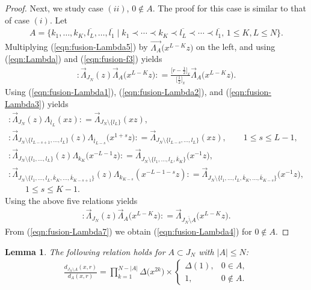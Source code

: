 \documentclass[10pt,a4paper]{amsart}
\numberwithin{equation}{section}
\newtheorem{Lemma}[Theorem]{Lemma}
\begin{document}
\begin{proof}
Next, we study case $(ii)$, $0 \notin A$. The proof for this case is similar to that of case $(i)$.
Let
\begin{gather*}
A=\big\{k_1, \dots,k_K, \overline{l_L}, \dots, \overline{l_1} \mid
k_1\prec \cdots \prec k_K \prec\overline{l_L} \prec \cdots \prec \overline{l_1},\,
1\leq K, L \leq N\big\}.
\end{gather*}
Multiplying (\ref{eqn:fusion-Lambda5}) by
$\overrightarrow{\Lambda_A}\big(x^{L-K}z\big)$
on the left, and using (\ref{eqn:Lambda}) and (\ref{eqn:fusion-f3}) yields
\begin{gather}
{:}\overrightarrow{\Lambda}_{J_N}(z)
\overrightarrow{\Lambda}_A\big(x^{L-K}z\big){:}=\frac{\big[r-\frac{1}{2}\big]_x}{\big[\frac{1}{2}\big]_x}
\overrightarrow{\Lambda}_A\big(x^{L-K}z\big).
\label{eqn:fusion-Lambda7}
\end{gather}
Using (\ref{eqn:fusion-Lambda1}), (\ref{eqn:fusion-Lambda2}), and
(\ref{eqn:fusion-Lambda3}) yields
\begin{gather*}
{:}\overrightarrow{\Lambda}_{J_N}(z)\Lambda_{\overline{l}_L}(xz){:}
=\overrightarrow{\Lambda}_{J_N{\setminus} \{l_L\}}(xz),
\\
{:}\overrightarrow{\Lambda}_{J_N{\setminus}
\{l_{L-s+1},\dots, l_{L}\}}(z)\Lambda_{\overline{l}_{L-s}}\big(x^{1+s}z\big){:}
=\overrightarrow{\Lambda}_{J_N{\setminus}
\{l_{L-s},\dots, l_L\}}(xz),\qquad
1\leq s \leq L-1,
\\
{:}\overrightarrow{\Lambda}_{J_N{\setminus} \{l_1, \dots, l_L\}}(z)
\Lambda_{{k}_K}\big(x^{-L-1}z\big){:}
=\overrightarrow{\Lambda}_{J_N{\setminus} \{l_1,\dots, l_L, \overline{k}_K\}}\big(x^{-1}z\big),
\\
{:}\overrightarrow{\Lambda}_{J_N{\setminus} \{l_1,\dots, l_{L},
\overline{k}_K, \dots, \overline{k}_{K-s+1}\}}(z)
\Lambda_{{k}_{K-s}}(x^{-L-1-s}z){:}
=\overrightarrow{\Lambda}_{J_N{\setminus} \{l_1,\dots, l_L, \overline{k}_K,\dots, \overline{k}_{K-s}\}}\big(x^{-1}z\big),
\\
\qquad
1\leq s \leq K-1.
\end{gather*}
Using the above five relations yields
\begin{gather*}
{:}\overrightarrow{\Lambda}_{J_N}(z)\overrightarrow{\Lambda}_A\big(x^{L-K}z\big){:}=
\overrightarrow{\Lambda}_{\overline{J_N \setminus A}}\big(x^{L-K}z\big).
\end{gather*}
From (\ref{eqn:fusion-Lambda7}) we obtain (\ref{eqn:fusion-Lambda4}) for $0 \notin A$.
\end{proof}

\begin{Lemma}
The following relation holds for $A \subset J_N$ with $|A|\leq N$:
\begin{gather}
\frac{d_{{J_N \setminus A}}(x,r)}{d_{A}(x,r)}=\prod_{k=1}^{N-|A|}
\Delta\big(x^{2k}\big){\times}
\begin{cases}
\Delta(1),& 0 \in A,
\\
1,&0 \notin A.
\end{cases}
\label{eqn:d}
\end{gather}
\end{Lemma}
\end{document}
